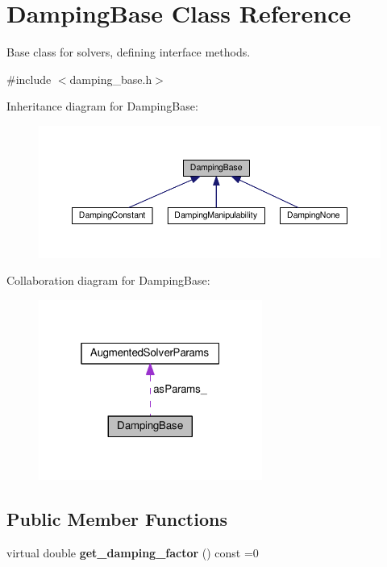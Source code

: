 \hypertarget{classDampingBase}{\section{Damping\-Base Class Reference}
\label{classDampingBase}
}


Base class for solvers, defining interface methods.  




{\ttfamily \#include $<$damping\-\_\-base.\-h$>$}



Inheritance diagram for Damping\-Base\-:
\nopagebreak
\begin{figure}[H]
\begin{center}
\leavevmode
\includegraphics[width=350pt]{classDampingBase__inherit__graph}
\end{center}
\end{figure}


Collaboration diagram for Damping\-Base\-:
\nopagebreak
\begin{figure}[H]
\begin{center}
\leavevmode
\includegraphics[width=208pt]{classDampingBase__coll__graph}
\end{center}
\end{figure}
\subsection*{Public Member Functions}
\begin{DoxyCompactItemize}
\item 
\hypertarget{classDampingBase_a0ff0d06272159afec03cf291d79d88e6}{virtual double {\bfseries get\-\_\-damping\-\_\-factor} () const =0}\label{classDampingBase_a0ff0d06272159afec03cf291d79d88e6}

\end{DoxyCompactItemize}
